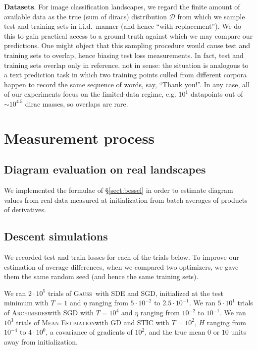 \documentclass[openany, notitlepage, justified]{tufte-book}
\theoremstyle{plain}
\theoremstyle{definition}
\newcommand{\Dd}{\mathcal{D}}
\newcommand{\Gauss}{\textsc{Gauss}}
\newcommand{\Archimedes}{\textsc{Archimedes}}
\newcommand{\MeanEstimation}{\textsc{Mean Estimation}}
\begin{document}
            \textbf{Datasets}.
                For image classification landscapes, we regard the finite amount of
                available data as the true (sum of diracs) distribution $\Dd$ from
                which we sample test and training sets in i.i.d.\ manner (and hence
                ``with replacement'').  We do this to gain practical access to a
                ground truth against which we may compare our predictions.  One
                might object that this sampling procedure would cause test and
                training sets to overlap, hence biasing test loss measurements.  In
                fact, test and training sets overlap only in reference, not in
                sense: the situation is analogous to a text prediction task in
                which two training points culled from different corpora happen to
                record the same sequence of words, say, ``Thank you!''.  In any
                case, all of our experiments focus on the limited-data regime, e.g.
                $10^1$ datapoints out of $\sim 10^{4.5}$ dirac masses, so overlaps
                are rare.

    \section{Measurement process}                                \label{appendix:measure}

        \subsection{Diagram evaluation on real landscapes}
            We implemented the formulae of \S\ref{sect:bessel} in order
            to estimate diagram values from real data measured at
            initialization from batch averages of products of derivatives.

        \subsection{Descent simulations}
            We recorded test and train losses for each of the trials below.  To
            improve our estimation of average differences, when we compared two
            optimizers, we gave them the same random seed (and hence the same
            training sets).

            We ran $2 \cdot 10^5$ trials of \Gauss\, with SDE and SGD,
            initialized at the test minimum with $T=1$ and $\eta$ ranging from
            $5\cdot 10^{-2}$ to $2.5\cdot 10^{-1}$.
            We ran $5 \cdot 10^1$ trials of \Archimedes with SGD with $T=10^4$
            and $\eta$ ranging from $10^{-2}$ to $10^{-1}$.
            We ran $10^3$ trials of \MeanEstimation with GD and STIC
            with $T=10^2$, $H$ ranging from $10^{-4}$ to $4 \cdot 10^0$,
            a covariance of gradients of $10^2$, and the true mean $0$ or
            $10$ units away from initialization.
\end{document}
